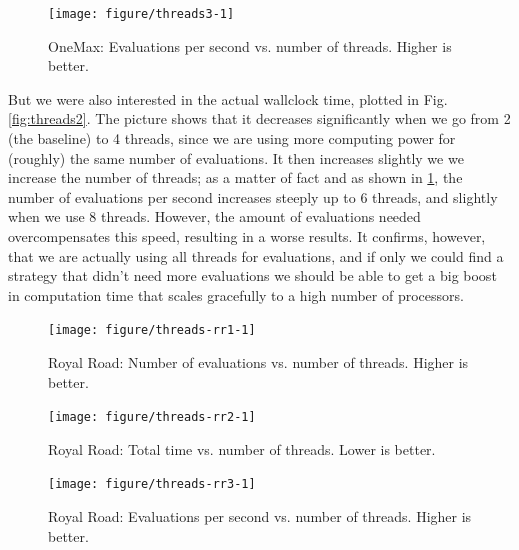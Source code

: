 \documentclass[sigconf]{acmart}\usepackage[]{graphicx}\usepackage[]{color}
\newenvironment{knitrout}{}{} %
\begin{document}
\begin{figure}[h!tb]
  \centering
\begin{knitrout}
\color{fgcolor}
\texttt{[image: figure/threads3-1]} 

\end{knitrout}
\caption{OneMax: Evaluations per second vs. number of threads. Higher is better.}
\label{fig:threads3}
\end{figure}
%
But we were also interested in the actual wallclock time, plotted in
Fig. \ref{fig:threads2}. The picture shows that it decreases
significantly when we go from 2 (the baseline) to 4 threads, since we
are using more computing power for (roughly) the same number of
evaluations. It then increases slightly we we increase the number of
threads; as a matter of fact and as shown in \ref{fig:threads3}, the
number of evaluations per second increases steeply up to 6 threads,
and slightly when we use 8 threads. However, the amount of evaluations
needed overcompensates this speed, resulting in a worse results. It
confirms, however, that we are actually using all threads for
evaluations, and if only we could find a strategy that didn't need
more evaluations we should be able to get a big boost in computation
time that scales gracefully to a high number of processors.

\begin{figure}[h!tb]
  \centering
\begin{knitrout}
\color{fgcolor}
\texttt{[image: figure/threads-rr1-1]} 

\end{knitrout}
\caption{Royal Road: Number of evaluations vs. number of threads. Higher is better.}
\label{fig:threads:rr:1}
\end{figure}
%
\begin{figure}[h!tb]
  \centering
\begin{knitrout}
\color{fgcolor}
\texttt{[image: figure/threads-rr2-1]} 

\end{knitrout}
\caption{Royal Road: Total time vs. number of threads. Lower is better.}
\label{fig:threads:rr:2}
\end{figure}
%
\begin{figure}[h!tb]
  \centering
\begin{knitrout}
\color{fgcolor}
\texttt{[image: figure/threads-rr3-1]} 

\end{knitrout}
\caption{Royal Road: Evaluations per second vs. number of threads. Higher is better.}
\label{fig:threads:rr:3}
\end{figure}
\end{document}
